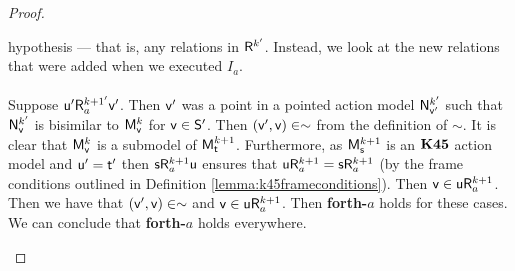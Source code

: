 \begin{proof}
\begin{itemize}
\begin{itemize}
	hypothesis --- that is, any relations in $\evR^{k'}$.
	Instead, we look at the new relations that were added when we executed $I_a$.\\
	\\
	Suppose $\evu' \evR^{k+1'}_a \evv'$.
	Then $\evv'$ was a point in a pointed action model $\evM^{k'}_{\evv'}$ such that $\evM^{k'}_{\evv}$
	is bisimilar to $\evMM^{k}_{\evv}$ for $\evv \in \evS'$.
	Then $(\evv',\evv) \in \sim$ from the definition of $\sim$.
	It is clear that $\evMM^k_\evv$ is a submodel of $\evMM^{k+1}_{\evt}$.
	Furthermore, as $\evMM^{k+1}_\evs$ is an $\AXKFF$ action model and $\evu' = \evt'$ then $\evs
	\evR^{k+1}_a \evu$ ensures that $\evu \evR^{k+1}_a = \evs \evR^{k+1}_a$ (by the frame conditions
	outlined in Definition \ref{lemma:k45frameconditions}).
	Then $\evv \in \evu \evR^{k+1}_a$.
	Then we have that $(\evv',\evv) \in \sim$ and $\evv \in \evu \evR^{k+1}_a$.
	Then {\bf forth-$a$} holds for these cases.
	We can conclude that {\bf forth-$a$} holds everywhere.
	\end{itemize}


\end{itemize}
\end{proof}
